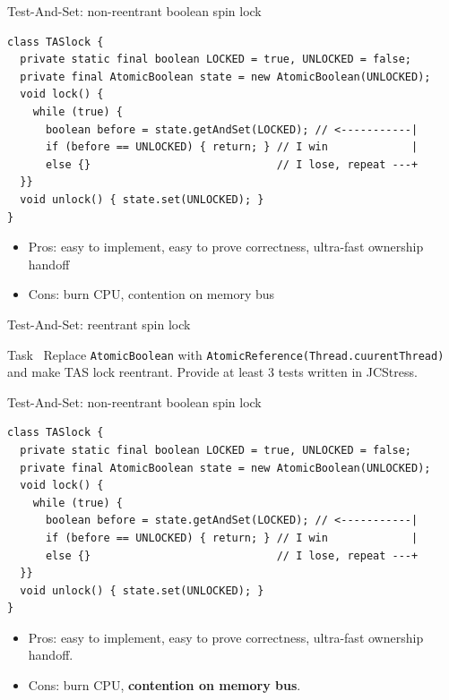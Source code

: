 \begin{frame}[fragile]{Test-And-Set: non-reentrant boolean spin lock}

\begin{verbatim}
class TASlock {
  private static final boolean LOCKED = true, UNLOCKED = false;
  private final AtomicBoolean state = new AtomicBoolean(UNLOCKED);
  void lock() {
    while (true) {
      boolean before = state.getAndSet(LOCKED); // <-----------|
      if (before == UNLOCKED) { return; } // I win             |
      else {}                             // I lose, repeat ---+      
  }}
  void unlock() { state.set(UNLOCKED); }
}
\end{verbatim}

\pause
\begin{itemize}
  \item Pros: easy to implement, easy to prove correctness, ultra-fast ownership handoff
  \item Cons: burn CPU, contention on memory bus
\end{itemize}
\end{frame}


\begin{frame}{Test-And-Set: reentrant spin lock}
\begin{homeworkmail}{Task~\taskReentrantTAS}{
    Replace \texttt{AtomicBoolean} with \texttt{AtomicReference(Thread.cuurentThread)} and make TAS lock reentrant. Provide at least 3 tests written in JCStress.
}
\end{homeworkmail}
\end{frame}


\begin{frame}[fragile]{Test-And-Set: non-reentrant boolean spin lock}

\begin{verbatim}
class TASlock {
  private static final boolean LOCKED = true, UNLOCKED = false;
  private final AtomicBoolean state = new AtomicBoolean(UNLOCKED);
  void lock() {
    while (true) {
      boolean before = state.getAndSet(LOCKED); // <-----------|
      if (before == UNLOCKED) { return; } // I win             |
      else {}                             // I lose, repeat ---+      
  }}
  void unlock() { state.set(UNLOCKED); }
}
\end{verbatim}

\begin{itemize}
  \item Pros: easy to implement, easy to prove correctness, ultra-fast ownership handoff.
  \item Cons: burn CPU, \textbf{contention on memory bus}. 
\end{itemize}
\end{frame}


